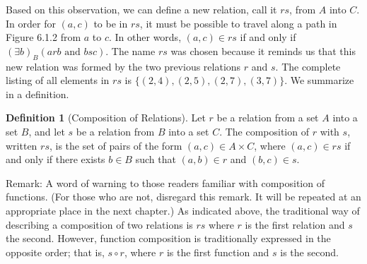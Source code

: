 \documentclass[10pt,]{book}
\theoremstyle{plain}
\theoremstyle{definition}
\newtheorem{definition}[theorem]{Definition}
\theoremstyle{definition}
\theoremstyle{definition}
\theoremstyle{definition}
\begin{document}
\par
Based on this observation, we can define a new relation, call it \(rs\), from \(A\) into \(C\). In order for \((a, c)\)
to be in \(rs\), it must be possible to travel along a path in Figure 6.1.2 from \(a\) to \(c\). In other words, \((a, c) \in rs\) if and only if \((\exists b)_B(a r b \textrm{ and } b s c)\). The name \(rs\) was chosen because it reminds us that this new relation was formed by the two previous relations \(r\) and \(s\). The complete listing of all elements in \(rs\) is \(\{(2, 4), (2, 5), (2, 7), (3, 7)\}\). We summarize in a definition.%
\begin{definition}[Composition of Relations]\label{def-composition-of-relations}
\label{notation-3}
Let \(r\) be a relation from a set \(A\) into a set \(B\), and let \(s\) be a relation from \(B\) into a set \(C\). The composition of \(r\) with \(s\), written \(rs\), is the set of pairs of the form \((a, c) \in A\times C\), where \((a, c) \in rs\) if and only if there exists \(b \in B\) such that \((a, b) \in r\) and \((b, c) \in s\).%
\end{definition}
\par
Remark: A word of warning to those readers familiar with composition of functions. (For those who are not, disregard this remark. It will be repeated at an appropriate place in the next chapter.) As indicated above, the traditional way of describing a composition of two relations is \(rs\) where \(r\) is the first relation and \(s\) the second. However, function composition is traditionally expressed in the opposite order; that is, \(s\circ r\), where \(r\) is the first function and \(s\) is the second.%
\typeout{************************************************}
\typeout{************************************************}
\end{document}

